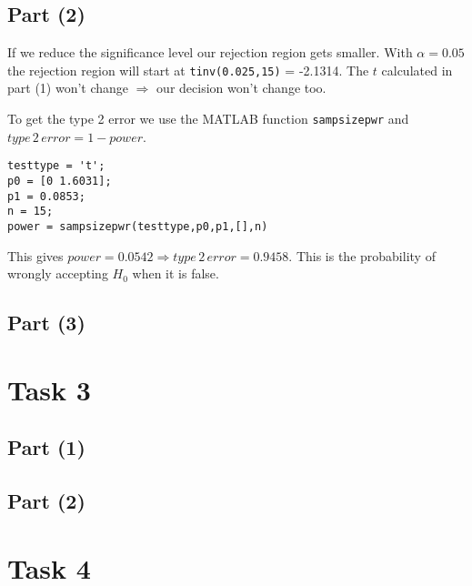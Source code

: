 \documentclass[british,a4paper,order=firstname]{mathscript}
\begin{document}
\subsection{Part (2)}
If we reduce the significance level our rejection region gets smaller. With $\alpha = 0.05$ the rejection region will start at \texttt{tinv(0.025,15)} = -2.1314. The $t$ calculated in part (1) won't change $\Rightarrow$ our decision won't change too.

To get the type 2 error we use the MATLAB function \texttt{sampsizepwr} and $type\, 2\, error = 1-power$.
\begin{lstlisting}
testtype = 't';
p0 = [0 1.6031];
p1 = 0.0853;
n = 15;
power = sampsizepwr(testtype,p0,p1,[],n)
\end{lstlisting}
This gives $power = 0.0542\Rightarrow type\, 2\, error = 0.9458$. This is the probability of wrongly accepting $H_0$ when it is false.

\subsection{Part (3)}

\pagebreak
\section{Task 3}
\subsection{Part (1)}

\subsection{Part (2)}

\pagebreak
\section{Task 4}
\end{document}

